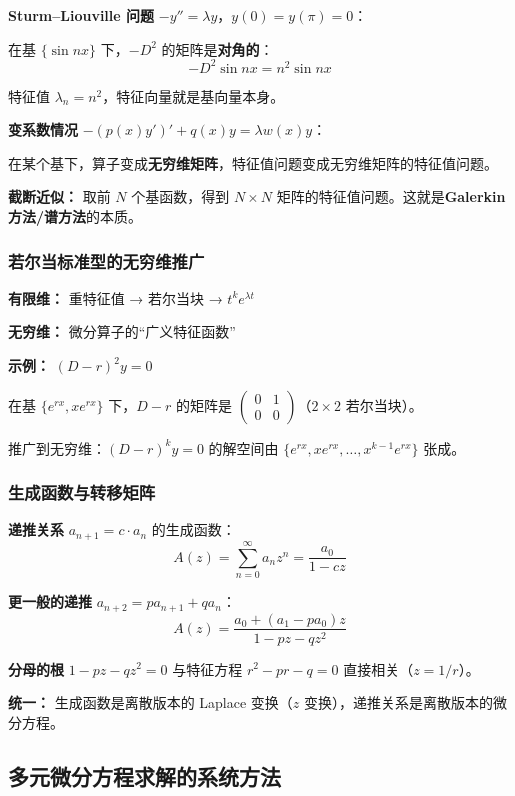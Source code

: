 \textbf{Sturm--Liouville 问题} $-y'' = \lambda y$，$y(0) = y(\pi) = 0$：

在基 $\{\sin nx\}$ 下，$-D^2$ 的矩阵是\textbf{对角的}：
\[
-D^2 \sin nx = n^2 \sin nx
\]

特征值 $\lambda_n = n^2$，特征向量就是基向量本身。

\textbf{变系数情况} $-(p(x)y')' + q(x)y = \lambda w(x)y$：

在某个基下，算子变成\textbf{无穷维矩阵}，特征值问题变成无穷维矩阵的特征值问题。

\textbf{截断近似：} 取前 $N$ 个基函数，得到 $N \times N$ 矩阵的特征值问题。这就是\textbf{Galerkin 方法/谱方法}的本质。

\subsubsection{若尔当标准型的无穷维推广}

\textbf{有限维：} 重特征值 → 若尔当块 → $t^k e^{\lambda t}$

\textbf{无穷维：} 微分算子的“广义特征函数”

\textbf{示例：} $(D - r)^2 y = 0$

在基 $\{e^{rx}, xe^{rx}\}$ 下，$D - r$ 的矩阵是 $\begin{pmatrix} 0 & 1 \\ 0 & 0 \end{pmatrix}$（$2\times 2$ 若尔当块）。

推广到无穷维：$(D - r)^k y = 0$ 的解空间由 $\{e^{rx}, xe^{rx}, \ldots, x^{k-1}e^{rx}\}$ 张成。

\subsubsection{生成函数与转移矩阵}

\textbf{递推关系} $a_{n+1} = c \cdot a_n$ 的生成函数：
\[
A(z) = \sum_{n=0}^{\infty} a_n z^n = \frac{a_0}{1 - cz}
\]

\textbf{更一般的递推} $a_{n+2} = pa_{n+1} + qa_n$：
\[
A(z) = \frac{a_0 + (a_1 - pa_0)z}{1 - pz - qz^2}
\]

\textbf{分母的根} $1 - pz - qz^2 = 0$ 与特征方程 $r^2 - pr - q = 0$ 直接相关（$z = 1/r$）。

\textbf{统一：} 生成函数是离散版本的 Laplace 变换（$z$ 变换），递推关系是离散版本的微分方程。

\subsection{多元微分方程求解的系统方法}


